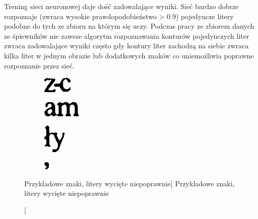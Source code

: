 \documentclass[a4paper,12pt]{article}
\begin{document}
             Trening sieci neuronowej daje dość zadowalające wyniki. Sieć bardzo dobrze rozpoznaje (zwraca wysokie prawdopodobieństwo > 0.9) pojedyncze litery podobne do tych ze zbioru na którym się uczy. Podczas pracy ze zbiorem danych ze śpiewników nie zawsze algorytm rozpoznawania konturów pojedynczych liter zwraca zadowalające wyniki często gdy kontury liter zachodzą na siebie zwraca kilka liter w jednym obrazie lub dodatkowych znaków co uniemożliwia poprawne rozpoznanie przez sieć. 

            \begin{figure}[h!]
                \centering
                \begin{subfigure}[b]{2cm}
                    \includegraphics[frame]{image//practicalPart//w_letter_01.png}
                \caption{}
                \end{subfigure}
                \begin{subfigure}[b]{2cm}
                    \includegraphics[frame]{image//practicalPart//w_letter_02.png}
                \caption{}
                \end{subfigure}
              \newline
                \begin{subfigure}[b]{2cm}
                    \includegraphics[frame]{image//practicalPart//w_letter_03.png}
                \caption{}
                \end{subfigure}
                \begin{subfigure}[b]{2cm}
                    \includegraphics[frame]{image//practicalPart//w_letter_04.png}
                    \caption{}
                \end{subfigure}
                \caption
                    [Przykladowe znaki, litery wycięte niepoprawnie]
                    {Przykladowe znaki, litery wycięte niepoprawnie}
            \end{figure}
\end{document}
